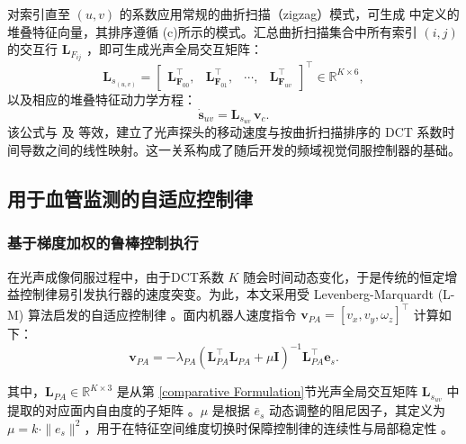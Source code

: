 \documentclass{article}
\begin{document}
对索引直至 $(u,v)$ 的系数应用常规的曲折扫描（zigzag）模式，可生成  中定义的堆叠特征向量，其排序遵循 (c)所示的模式。汇总曲折扫描集合中所有索引 $(i,j)$ 的交互行 $\boldsymbol{L}_{F_{ij}}$ ，即可生成光声全局交互矩阵：
\begin{equation}
\boldsymbol{L}_{s_{(u,v)}} = 
\begin{bmatrix}
\boldsymbol{L}_{\boldsymbol{F}_{00}}^\top, & 
\boldsymbol{L}_{\boldsymbol{F}_{01}}^\top, & 
\cdots, & 
\boldsymbol{L}_{\boldsymbol{F}_{uv}}^\top
\end{bmatrix}^\top \in \mathbb{R}^{K \times 6},
\label{eq:Lsuvmat}
\end{equation}
以及相应的堆叠特征动力学方程：
\begin{equation}
\dot{\mathbf{s}}_{uv} = \boldsymbol{L}_{s_{uv}} \, \mathbf{v}_c.
\end{equation}
该公式与  及  等效，建立了光声探头的移动速度与按曲折扫描排序的 DCT 系数时间导数之间的线性映射。这一关系构成了随后开发的频域视觉伺服控制器的基础。


\subsection{用于血管监测的自适应控制律}
\label{sec:Adaptive_Control_Law}

\subsubsection{基于梯度加权的鲁棒控制执行}

在光声成像伺服过程中，由于DCT系数 $K$ 随会时间动态变化，于是传统的恒定增益控制律易引发执行器的速度突变。为此，本文采用受 Levenberg-Marquardt (L-M) 算法启发的自适应控制律 。面内机器人速度指令 $\mathbf{v}_{PA} = [v_x, v_y, \omega_z]^\top$ 计算如下\cite{dame2009entropy,collewet2011photometric,marchand2019subspace}：
\begin{equation}
\mathbf{v}_{PA} = -\lambda_{PA} (\mathbf{L}_{PA}^\top \mathbf{L}_{PA} + \mu \mathbf{I})^{-1} \mathbf{L}_{PA}^\top \mathbf{e}_s.
\end{equation}

其中，$\boldsymbol{\mathbf{L}}_{PA} \in \mathbb{R}^{K \times 3}$ 是从第 \cref{comparative Formulation}节光声全局交互矩阵 $\boldsymbol{L}_{s_{uv}}$ 中提取的对应面内自由度的子矩阵 。$\mu$ 是根据 $\bar{e}_s$ 动态调整的阻尼因子，其定义为$\mu = k \cdot \|e_s\|^2$，用于在特征空间维度切换时保障控制律的连续性与局部稳定性 。
\end{document}
